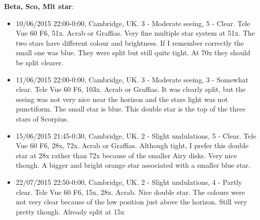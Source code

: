 {\bf Beta, Sco, Mlt star}:
\begin{itemize}
\item 10/06/2015 22:00-0:00, Cambridge, UK. 3 - Moderate seeing, 5 - Clear. Tele Vue 60 F6, 51x. Acrab or Graffias. Very fine multiple star system at 51x. The two stars have different colour and brightness. If I remember correctly the small one was blue. They were split but still quite tight. At 70x they should be split clearer. 
\item 11/06/2015 22:00-0:00, Cambridge, UK. 3 - Moderate seeing, 3 - Somewhat clear. Tele Vue 60 F6, 103x. Acrab or Graffias. It was clearly split, but the seeing was not very nice near the horizon and the stars light was not punctiform. The small star is blue. This double star is the top of the three stars of Scorpius.
\item 15/06/2015 21:45-0:30, Cambridge, UK. 2 - Slight undulations, 5 - Clear. Tele Vue 60 F6, 28x, 72x. Acrab or Graffias. Although tight, I prefer this double star at 28x rather than 72x because of the smaller Airy disks. Very nice though. A bigger and bright orange star associated with a smaller blue star. 
\item 22/07/2015 22:50-0:00, Cambridge, UK. 2 - Slight undulations, 4 - Partly clear. Tele Vue 60 F6, 15x, 28x. Acrab. Nice double star. The colours were not very clear because of the low position just above the horizon. Still very pretty though. Already split at 15x
\end{itemize}

